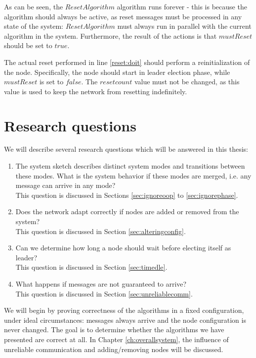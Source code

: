As can be seen, the $ResetAlgorithm$ algorithm runs forever - this is because the algorithm should always be active, as reset messages must be processed in any state of the system: $ResetAlgorithm$ must always run in parallel with the current algorithm in the system. Furthermore, the result of the  actions is that $mustReset$ should be set to $true$.

The actual reset performed in line \ref{reset:doit} should perform a reinitialization of the node. Specifically, the node should start in leader election phase, while $mustReset$ is set to $false$. The $resetcount$ value must not be changed, as this value is used to keep the network from resetting indefinitely.

\section{Research questions}
\label{sec:questions}

We will describe several research questions which will be answered in this thesis:

\begin{enumerate}
\item The system sketch describes distinct system modes and transitions between these modes. What is the system behavior if these modes are merged, i.e. any message can arrive in any mode? \\
This question is discussed in Sections \ref{sec:ignoreoop} to \ref{sec:ignorephase}.
\item Does the network adapt correctly if nodes are added or removed from the system? \\
This question is discussed in Section \ref{sec:alteringconfig}.
\item Can we determine how long a node should wait before electing itself as leader? \\
This question is discussed in Section \ref{sec:timedle}.
\item What happens if messages are not guaranteed to arrive? \\
This question is discussed in Section \ref{sec:unreliablecomm}.
\end{enumerate}

We will begin by proving correctness of the algorithms in a fixed configuration, under ideal circumstances: messages always arrive and the node configuration is never changed. The goal is to determine whether the algorithms we have presented are correct at all. In Chapter \ref{ch:overallsystem}, the influence of unreliable communication and adding/removing nodes will be discussed.

